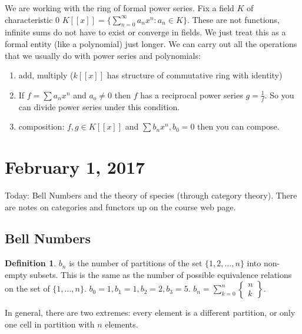 \documentclass[12pt]{article}
\theoremstyle{definition}
\newtheorem{defn}{Definition}
\begin{document}
We are working with the ring of formal power series. Fix a field $K$ of
characteristic 0 $K[[x]] = \{\sum_{n=0}^\infty a_n x^n : a_n \in K\}$. These
are not functions, infinite sums do not have to exist or converge in fields. We
just treat this as a formal entity (like a polynomial) just longer. We can
carry out all the operations that we usually do with power series and
polynomials:
\begin{enumerate}
    \item add, multiply ($k[[x]]$ has structure of commutative ring with identity)
    \item If $f = \sum a_nx^n $ and $a_o \ne 0$ then $f$ has a reciprocal power
    series $g = \frac{1}{f}$. So you can divide power series under this condition.
    \item composition: $f, g \in  K[[x]]$ and $\sum b_n x^n, b_0 = 0$ then you can compose.
\end{enumerate}

\section{February 1, 2017}

Today: Bell Numbers and the theory of species (through category theory). There
are notes on categories and functors up on the course web page.

\subsection{Bell Numbers}

\begin{defn}
    $b_n$ is the number of partitions of the set $\{1, 2, \ldots, n \}$ into
    non-empty subsets. This is the same as the number of possible equivalence
    relations on the set of $\{1, \ldots, n\}$. $b_0 = 1, b_1 = 1, b_2 = 2, b_3
    = 5$. $b_n = \sum_{k=0}^n \begin{Bmatrix} n \\ k \end{Bmatrix}$.
\end{defn}

In general, there are two extremes: every element is a different partition, or
only one cell in partition with $n$ elements.
\end{document}
